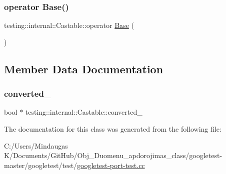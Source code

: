 \subsubsection{\texorpdfstring{operator Base()}{operator Base()}\hspace{0.1cm}{\footnotesize\ttfamily [3/3]}}
{\footnotesize\ttfamily testing\+::internal\+::\+Castable\+::operator \mbox{\hyperlink{class_base}{Base}} (\begin{DoxyParamCaption}{ }\end{DoxyParamCaption})\hspace{0.3cm}{\ttfamily [inline]}}



\subsection{Member Data Documentation}
\mbox{\label{classtesting_1_1internal_1_1_castable_af7be4df2e80181ffdd7762d4a10e08b1}} 
\subsubsection{\texorpdfstring{converted\_}{converted\_}}
{\footnotesize\ttfamily bool $\ast$ testing\+::internal\+::\+Castable\+::converted\+\_\+\hspace{0.3cm}{\ttfamily [private]}}



The documentation for this class was generated from the following file\+:\begin{DoxyCompactItemize}
\item 
C\+:/\+Users/\+Mindaugas K/\+Documents/\+Git\+Hub/\+Obj\+\_\+\+Duomenu\+\_\+apdorojimas\+\_\+class/googletest-\/master/googletest/test/\mbox{\hyperlink{googletest-master_2googletest_2test_2googletest-port-test_8cc}{googletest-\/port-\/test.\+cc}}\end{DoxyCompactItemize}
